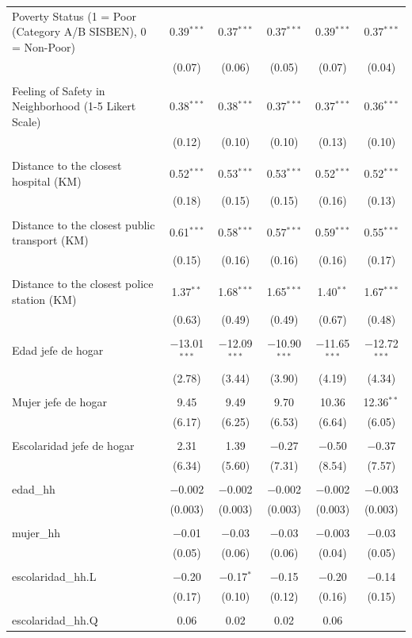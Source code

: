 \begin{table}[H]
\begin{tabularx}{0.9\textwidth}{@{\extracolsep{-7pt}}lccccc}
 Poverty Status (1 = Poor (Category A/B SISBEN), 0 = Non-Poor) & 0.39$^{***}$ & 0.37$^{***}$ & 0.37$^{***}$ & 0.39$^{***}$ & 0.37$^{***}$ \\    & (0.07) & (0.06) & (0.05) & (0.07) & (0.04) \\    & & & & & \\   Feeling of Safety in Neighborhood (1-5 Likert Scale) & 0.38$^{***}$ & 0.38$^{***}$ & 0.37$^{***}$ & 0.37$^{***}$ & 0.36$^{***}$ \\    & (0.12) & (0.10) & (0.10) & (0.13) & (0.10) \\    & & & & & \\   Distance to the closest hospital (KM) & 0.52$^{***}$ & 0.53$^{***}$ & 0.53$^{***}$ & 0.52$^{***}$ & 0.52$^{***}$ \\    & (0.18) & (0.15) & (0.15) & (0.16) & (0.13) \\    & & & & & \\   Distance to the closest public transport  (KM) & 0.61$^{***}$ & 0.58$^{***}$ & 0.57$^{***}$ & 0.59$^{***}$ & 0.55$^{***}$ \\    & (0.15) & (0.16) & (0.16) & (0.16) & (0.17) \\    & & & & & \\   Distance to the closest police station (KM) & 1.37$^{**}$ & 1.68$^{***}$ & 1.65$^{***}$ & 1.40$^{**}$ & 1.67$^{***}$ \\    & (0.63) & (0.49) & (0.49) & (0.67) & (0.48) \\    & & & & & \\   Edad jefe de hogar & $-$13.01$^{***}$ & $-$12.09$^{***}$ & $-$10.90$^{***}$ & $-$11.65$^{***}$ & $-$12.72$^{***}$ \\    & (2.78) & (3.44) & (3.90) & (4.19) & (4.34) \\    & & & & & \\   Mujer jefe de hogar & 9.45 & 9.49 & 9.70 & 10.36 & 12.36$^{**}$ \\    & (6.17) & (6.25) & (6.53) & (6.64) & (6.05) \\    & & & & & \\   Escolaridad jefe de hogar & 2.31 & 1.39 & $-$0.27 & $-$0.50 & $-$0.37 \\    & (6.34) & (5.60) & (7.31) & (8.54) & (7.57) \\    & & & & & \\   edad\_hh & $-$0.002 & $-$0.002 & $-$0.002 & $-$0.002 & $-$0.003 \\    & (0.003) & (0.003) & (0.003) & (0.003) & (0.003) \\    & & & & & \\   mujer\_hh & $-$0.01 & $-$0.03 & $-$0.03 & $-$0.003 & $-$0.03 \\    & (0.05) & (0.06) & (0.06) & (0.04) & (0.05) \\    & & & & & \\   escolaridad\_hh.L & $-$0.20 & $-$0.17$^{*}$ & $-$0.15 & $-$0.20 & $-$0.14 \\    & (0.17) & (0.10) & (0.12) & (0.16) & (0.15) \\    & & & & & \\   escolaridad\_hh.Q & 0.06 & 0.02 & 0.02 & 0.06 
\end{tabularx}
\end{table}
